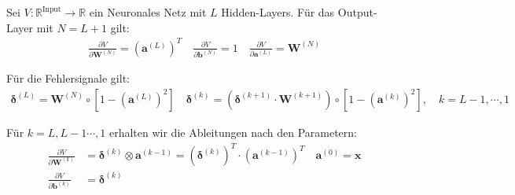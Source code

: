 \documentclass[a4paper, 12pt]{scrartcl}
\begin{document}
\begin{satz}[Backpropagation]
    Sei $V:\mathbb{R}^{\text{Input}} \to \mathbb{R}$ ein Neuronales Netz mit $L$ Hidden-Layers.
    Für das Output-Layer mit $N = L+1$ gilt:
    \begin{align*}
        \frac{\partial V}{\partial \bm{W}^{(N)}} = \left(\bm{a}^{(L)} \right)^T
        \quad
        \frac{\partial V}{\partial \bm{b}^{(N)}} = 1 
        \quad
        \frac{\partial V}{\partial \bm{a}^{(L)}} = \bm{W}^{(N)}
    \end{align*}

    Für die Fehlersignale gilt:
    \begin{align*}
        \bm{\delta}^{(L)} = \bm{W}^{(N)} \circ \left[1 - \left(\bm{a}^{(L)}\right)^2 \right]
        \quad
        \bm{\delta}^{(k)} 
        = 
        \left(
            \bm{\delta}^{(k+1)} \cdot \bm{W}^{(k+1)}
        \right) 
        \circ  
        \left[
            1 - \left(\bm{a}^{(k)}\right)^2 
        \right],
        \quad
        k=L-1, \cdots , 1
    \end{align*}

    Für $k= L, L-1 \cdots , 1$ erhalten wir die Ableitungen nach den Parametern:
    \begin{align*}
        \frac{\partial V}{\partial \bm{W}^{(k)}} 
        &= 
        \bm{\delta}^{(k)} \otimes \bm{a}^{(k-1)} 
        =
        \left(\bm{\delta}^{(k)}\right)^T \cdot \left(\bm{a}^{(k-1)}\right)^T
        \quad 
        \bm{a}^{(0)} = \bm{x} \\
        \frac{\partial V}{\partial \bm{b}^{(k)}} &= \bm{\delta}^{(k)} \\
    \end{align*}
\end{satz}
\end{document}
